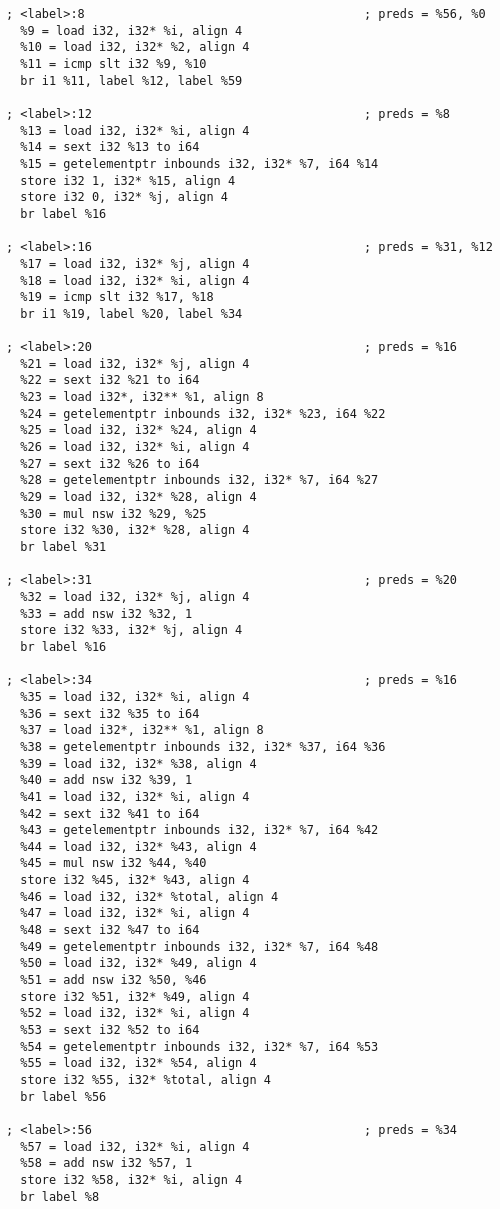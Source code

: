 \begin{verbatim}
; <label>:8                                       ; preds = %56, %0
  %9 = load i32, i32* %i, align 4
  %10 = load i32, i32* %2, align 4
  %11 = icmp slt i32 %9, %10
  br i1 %11, label %12, label %59

; <label>:12                                      ; preds = %8
  %13 = load i32, i32* %i, align 4
  %14 = sext i32 %13 to i64
  %15 = getelementptr inbounds i32, i32* %7, i64 %14
  store i32 1, i32* %15, align 4
  store i32 0, i32* %j, align 4
  br label %16

; <label>:16                                      ; preds = %31, %12
  %17 = load i32, i32* %j, align 4
  %18 = load i32, i32* %i, align 4
  %19 = icmp slt i32 %17, %18
  br i1 %19, label %20, label %34

; <label>:20                                      ; preds = %16
  %21 = load i32, i32* %j, align 4
  %22 = sext i32 %21 to i64
  %23 = load i32*, i32** %1, align 8
  %24 = getelementptr inbounds i32, i32* %23, i64 %22
  %25 = load i32, i32* %24, align 4
  %26 = load i32, i32* %i, align 4
  %27 = sext i32 %26 to i64
  %28 = getelementptr inbounds i32, i32* %7, i64 %27
  %29 = load i32, i32* %28, align 4
  %30 = mul nsw i32 %29, %25
  store i32 %30, i32* %28, align 4
  br label %31

; <label>:31                                      ; preds = %20
  %32 = load i32, i32* %j, align 4
  %33 = add nsw i32 %32, 1
  store i32 %33, i32* %j, align 4
  br label %16

; <label>:34                                      ; preds = %16
  %35 = load i32, i32* %i, align 4
  %36 = sext i32 %35 to i64
  %37 = load i32*, i32** %1, align 8
  %38 = getelementptr inbounds i32, i32* %37, i64 %36
  %39 = load i32, i32* %38, align 4
  %40 = add nsw i32 %39, 1
  %41 = load i32, i32* %i, align 4
  %42 = sext i32 %41 to i64
  %43 = getelementptr inbounds i32, i32* %7, i64 %42
  %44 = load i32, i32* %43, align 4
  %45 = mul nsw i32 %44, %40
  store i32 %45, i32* %43, align 4
  %46 = load i32, i32* %total, align 4
  %47 = load i32, i32* %i, align 4
  %48 = sext i32 %47 to i64
  %49 = getelementptr inbounds i32, i32* %7, i64 %48
  %50 = load i32, i32* %49, align 4
  %51 = add nsw i32 %50, %46
  store i32 %51, i32* %49, align 4
  %52 = load i32, i32* %i, align 4
  %53 = sext i32 %52 to i64
  %54 = getelementptr inbounds i32, i32* %7, i64 %53
  %55 = load i32, i32* %54, align 4
  store i32 %55, i32* %total, align 4
  br label %56

; <label>:56                                      ; preds = %34
  %57 = load i32, i32* %i, align 4
  %58 = add nsw i32 %57, 1
  store i32 %58, i32* %i, align 4
  br label %8


\end{verbatim}
